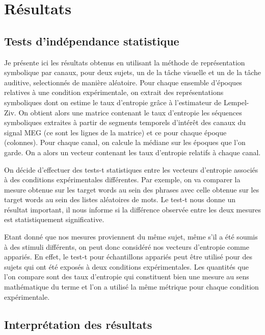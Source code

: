 \chapter{Résultats}

\section{Tests d'indépendance statistique}

Je présente ici les résultats obtenus en utilisant la méthode de représentation symbolique par canaux, pour deux sujets, un de la tâche visuelle et un de la tâche auditive, selectionnés de manière aléatoire. Pour chaque ensemble d'époques relatives à une condition expérimentale, on extrait des représentations symboliques dont on estime le taux d'entropie grâce à l'estimateur de Lempel-Ziv. On obtient alors une matrice contenant le taux d'entropie les séquences symboliques extraites à partir de segments temporels d'intérêt des canaux du signal MEG (ce sont les lignes de la matrice) et ce pour chaque époque (colonnes). Pour chaque canal, on calcule la médiane sur les époques que l'on garde. On a alors un vecteur contenant les taux d'entropie relatifs à chaque canal.

\vspace{2ex}
On décide d'effectuer des tests-t statistiques \cite{22} entre les vecteurs d'entropie associés à des conditions expérimentales différentes. Par exemple, on va comparer la mesure obtenue sur les target words au sein des phrases avec celle obtenue sur les target words au sein des listes aléatoires de mots.
Le test-t nous donne un résultat important, il nous informe si la différence observée entre les deux mesures est statistiquement significative.

\vspace{2ex}
Etant donné que nos mesures proviennent du même sujet, même s'il a été soumis à des stimuli différents, on peut donc considéré nos vecteurs d'entropie comme appariés. En effet, le test-t pour échantillons appariés peut être utilisé pour des sujets qui ont été exposés à deux conditions expérimentales. Les quantités que l'on compare sont des taux d'entropie qui constituent bien une mesure au sens mathématique du terme et l'on a utilisé la même métrique pour chaque condition expérimentale. 

\section{Interprétation des résultats}

